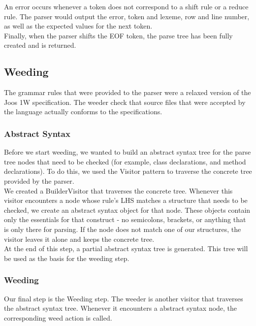 \documentclass[12pt, a4paper]{article}
\begin{document}
An error occurs whenever a token does not correspond to a shift rule or a reduce rule. The parser would output the error, token and lexeme, row and line number, as well as the expected values for the next token. \\

Finally, when the parser shifts the EOF token, the parse tree has been fully created and is returned.

\subsection{Weeding}

The grammar rules that were provided to the parser were a relaxed version of the Joos 1W specification. The weeder check that source files that were accepted by the language actually conforms to the specifications.

\subsubsection{Abstract Syntax}
Before we start weeding, we wanted to build an abstract syntax tree for the parse tree nodes that need to be checked (for example, class declarations, and method declarations). To do this, we used the Visitor pattern to traverse the concrete tree provided by the parser. \\

We created a BuilderVisitor that traverses the concrete tree. Whenever this visitor encounters a node whose rule's LHS matches a structure that needs to be checked, we create an abstract syntax object for that node. These objects contain only the essentials for that construct - no semicolons, brackets, or anything that is only there for parsing. If the node does not match one of our structures, the visitor leaves it alone and keeps the concrete tree. \\

At the end of this step, a partial abstract syntax tree is generated. This tree will be used as the basis for the weeding step.

\subsubsection{Weeding}

Our final step is the Weeding step. The weeder is another visitor that traverses the abstract syntax tree. Whenever it encounters a abstract syntax node, the corresponding weed action is called. \\
\end{document}
